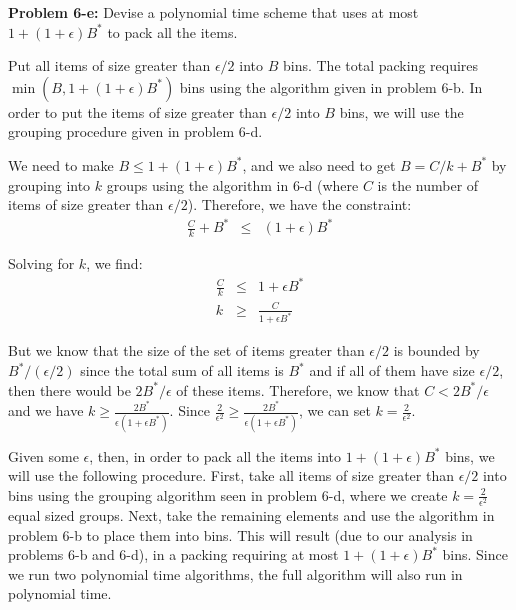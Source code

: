 \documentclass[psamsfonts]{amsart}
\newenvironment{sol}{\vspace{0.25cm}{\large \bfseries Solution:}}{\qedsymbol}
\newenvironment{prob}[1]{\begin{framed}{\large \bfseries Problem #1:}}{\end{framed}}
\begin{document}
\begin{prob}{6-e}
Devise a polynomial time scheme that uses at most $1 + (1+\epsilon)B^*$ to pack all the items.
\end{prob}
\begin{sol}
Put all items of size greater than $\epsilon/2$ into $B$ bins. The total packing requires $\min(B, 1 + (1 + \epsilon) B^*)$ bins using the algorithm given in problem 6-b. In order to put the items of size greater than $\epsilon/2$ into $B$ bins, we will use the grouping procedure given in problem 6-d.

We need to make $B \leq 1 +  (1 + \epsilon) B^*$, and we also need to get $B = C/k + B^*$ by grouping into $k$ groups using the algorithm in 6-d (where $C$ is the number of items of size greater than $\epsilon/2$). Therefore, we have the constraint:
\begin{eqnarray}
\frac{C}{k} + B^* &\leq& (1 + \epsilon) B^* 
\end{eqnarray}

Solving for $k$, we find:
\begin{eqnarray}
\frac{C}{k} &\leq& 1 + \epsilon B^* \\
k &\geq& \frac{C}{1 + \epsilon B^*}
\end{eqnarray}

But we know that the size of the set of items greater than $\epsilon /2$ is bounded by $B^* / (\epsilon /2)$ since the total sum of all items is $B^*$ and if all of them have size $\epsilon / 2$, then there would be $2 B^* / \epsilon$ of these items. Therefore, we know that $C < 2 B^* / \epsilon$ and we have $k \geq \frac{2 B^*}{\epsilon ( 1 + \epsilon B^*)}$. Since $\frac{2}{\epsilon^2} \geq \frac{2 B^*}{\epsilon(1 + \epsilon B^*)}$, we can set $k = \frac{2}{\epsilon^2}$. 

Given some $\epsilon$, then, in order to pack all the items into $1 + (1 + \epsilon) B^*$ bins, we will use the following procedure. First, take all items of size greater than $\epsilon/2$ into bins using the grouping algorithm seen in problem 6-d, where we create $k = \frac{2}{\epsilon^2}$ equal sized groups. Next, take the remaining elements and use the algorithm in problem 6-b to place them into bins. This will result (due to our analysis in problems 6-b and 6-d), in a packing requiring at most $1 + (1 + \epsilon) B^*$ bins. Since we run two polynomial time algorithms, the full algorithm will also run in polynomial time. 
\end{sol}
\end{document}

